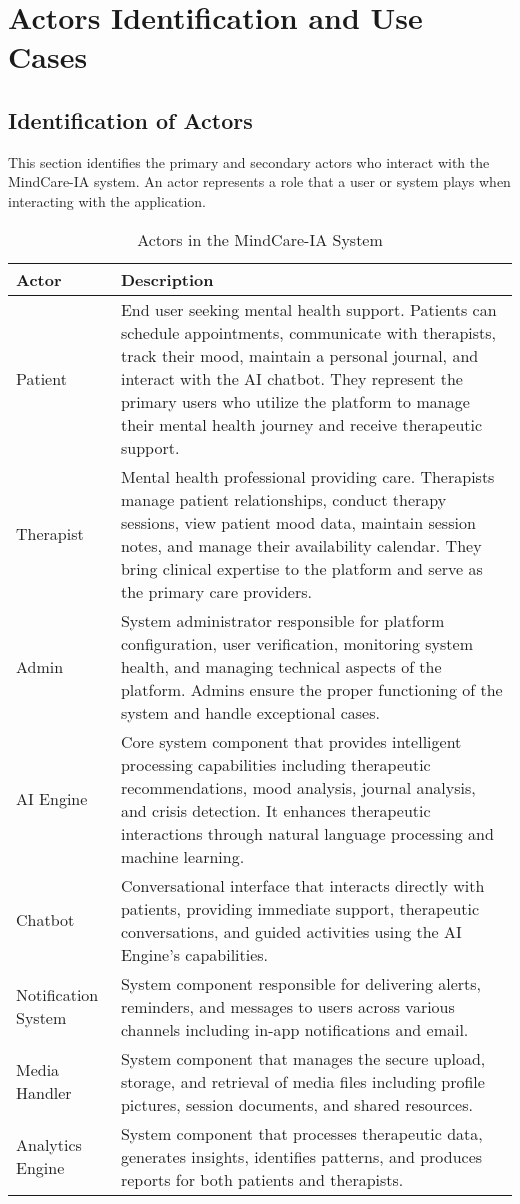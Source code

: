 \section{Actors Identification and Use Cases}

\subsection{Identification of Actors}
This section identifies the primary and secondary actors who interact with the MindCare-IA system. An actor represents a role that a user or system plays when interacting with the application.

\begin{table}[h]
\centering
\begin{tabular}{|p{3cm}|p{10cm}|}
\hline
\textbf{Actor} & \textbf{Description} \\
\hline
Patient & End user seeking mental health support. Patients can schedule appointments, communicate with therapists, track their mood, maintain a personal journal, and interact with the AI chatbot. They represent the primary users who utilize the platform to manage their mental health journey and receive therapeutic support. \\
\hline
Therapist & Mental health professional providing care. Therapists manage patient relationships, conduct therapy sessions, view patient mood data, maintain session notes, and manage their availability calendar. They bring clinical expertise to the platform and serve as the primary care providers. \\
\hline
Admin & System administrator responsible for platform configuration, user verification, monitoring system health, and managing technical aspects of the platform. Admins ensure the proper functioning of the system and handle exceptional cases. \\
\hline
AI Engine & Core system component that provides intelligent processing capabilities including therapeutic recommendations, mood analysis, journal analysis, and crisis detection. It enhances therapeutic interactions through natural language processing and machine learning. \\
\hline
Chatbot & Conversational interface that interacts directly with patients, providing immediate support, therapeutic conversations, and guided activities using the AI Engine's capabilities. \\
\hline
Notification System & System component responsible for delivering alerts, reminders, and messages to users across various channels including in-app notifications and email. \\
\hline
Media Handler & System component that manages the secure upload, storage, and retrieval of media files including profile pictures, session documents, and shared resources. \\
\hline
Analytics Engine & System component that processes therapeutic data, generates insights, identifies patterns, and produces reports for both patients and therapists. \\
\hline
\end{tabular}
\caption{Actors in the MindCare-IA System}
\end{table}


